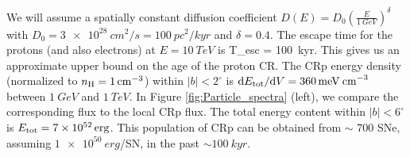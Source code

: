 We will assume a spatially constant diffusion coefficient $D(E) = D_0\left(\frac{E}{\SI{1}{GeV}}\right)^\delta$ with $D_0 = \SI{3e28}{cm^2/s} = \SI{100}{pc^2/kyr}$ and $\delta = 0.4$.
The escape time for the protons (and also electrons) at $E = \SI{10}{TeV}$ is  
\be
T_{\rm esc} =  \approx \SI{100}{kyr}.
\ee
This gives us an approximate upper bound on the age of the proton CR.
The CRp energy density (normalized to $n_{\text{H}} = \SI{1}{cm^{-3}}$) within $|b| < 2^\circ$ is 
$\text{d} E_{\text{tot}} / \text{d} V = \SI{360}{meV\: cm^{-3}}$ between $\SI{1}{GeV}$ and $\SI{1}{TeV}$.
In Figure \ref{fig:Particle_spectra} (left), we compare the corresponding flux to the local CRp flux.
The total energy content within $|b| < 6^\circ$ is $E_{\text{tot}} = \SI{7e52}{erg}$.
This population of CRp can be obtained from $\sim$ 700 SNe, assuming $\SI{1e50}{erg}$/SN, in the past $\sim \SI{100}{kyr}$. 
\\


